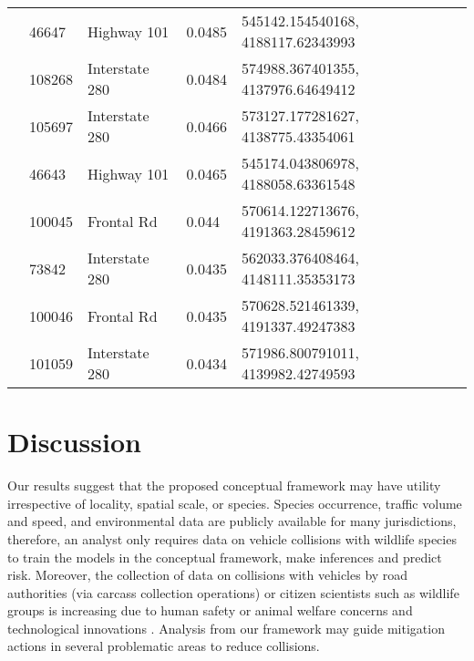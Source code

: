 \begin{table}[!t]
\begin{tabularx}{0.9\textwidth}{lllll}
           & 46647  & Highway 101     & 0.0485         & 545142.154540168, 4188117.62343993 \\
           & 108268 & Interstate 280  & 0.0484         & 574988.367401355, 4137976.64649412 \\
           & 105697 & Interstate 280  & 0.0466         & 573127.177281627, 4138775.43354061 \\
           & 46643  & Highway 101     & 0.0465         & 545174.043806978, 4188058.63361548 \\
           & 100045 & Frontal Rd      & 0.044          & 570614.122713676, 4191363.28459612 \\
           & 73842  & Interstate 280  & 0.0435         & 562033.376408464, 4148111.35353173 \\
           & 100046 & Frontal Rd      & 0.0435         & 570628.521461339, 4191337.49247383 \\
           & 101059 & Interstate 280  & 0.0434         & 571986.800791011, 4139982.42749593 \\
\bottomrule
\end{tabularx}
\label{rd_seg_risk}
\end{table}

\section{Discussion}

Our results suggest that the proposed conceptual framework may have utility irrespective of locality, spatial scale, or species.  Species occurrence, traffic volume and speed, and environmental data are publicly available for many jurisdictions, therefore, an analyst only requires data on vehicle collisions with wildlife species to train the models in the conceptual framework, make inferences and predict risk.  Moreover, the collection of data on collisions with vehicles by road authorities (via carcass collection operations) or citizen scientists such as wildlife groups is increasing due to human safety or animal welfare concerns and technological innovations \citep[see][]{olso14,shil15b}.  Analysis from our framework may guide mitigation actions in several problematic areas to reduce collisions.

